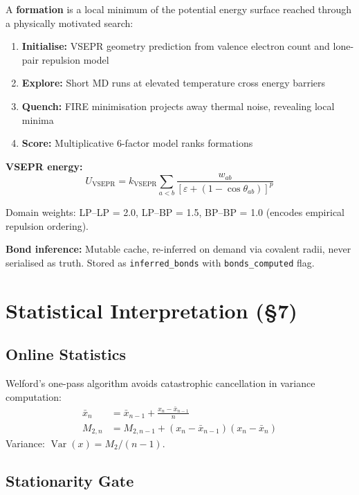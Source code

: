 \documentclass[11pt, a4paper]{article}
\DeclareMathOperator{\Var}{Var}
\begin{document}
A \textbf{formation} is a local minimum of the potential energy surface reached through a physically motivated search:

\begin{enumerate}
\item \textbf{Initialise:} VSEPR geometry prediction from valence electron count and lone-pair repulsion model
\item \textbf{Explore:} Short MD runs at elevated temperature cross energy barriers
\item \textbf{Quench:} FIRE minimisation projects away thermal noise, revealing local minima
\item \textbf{Score:} Multiplicative 6-factor model ranks formations
\end{enumerate}

\textbf{VSEPR energy:}
\begin{equation}
U_\text{VSEPR} = k_\text{VSEPR} \sum_{a<b} \frac{w_{ab}}{[\varepsilon + (1 - \cos\theta_{ab})]^p}
\end{equation}

Domain weights: LP--LP = 2.0, LP--BP = 1.5, BP--BP = 1.0 (encodes empirical repulsion ordering).

\textbf{Bond inference:} Mutable cache, re-inferred on demand via covalent radii, never serialised as truth.  Stored as \texttt{inferred\_bonds} with \texttt{bonds\_computed} flag.


\section{Statistical Interpretation (\S7)}

\subsection{Online Statistics}

Welford's one-pass algorithm avoids catastrophic cancellation in variance computation:
\begin{align}
\bar{x}_n &= \bar{x}_{n-1} + \frac{x_n - \bar{x}_{n-1}}{n} \\
M_{2,n} &= M_{2,n-1} + (x_n - \bar{x}_{n-1})(x_n - \bar{x}_n)
\end{align}
Variance: $\Var(x) = M_2 / (n-1)$.

\subsection{Stationarity Gate}
\end{document}
